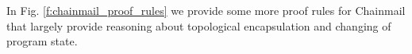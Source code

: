 \documentclass[acmsmall,review,anonymous]{acmart}\settopmatter{printfolios=true,printccs=false,printacmref=false}
\begin{document}
In Fig. \ref{f:chainmail_proof_rules} we provide some more proof rules for 
Chainmail that largely provide reasoning about topological encapsulation and 
changing of program state. 

\end{document}
